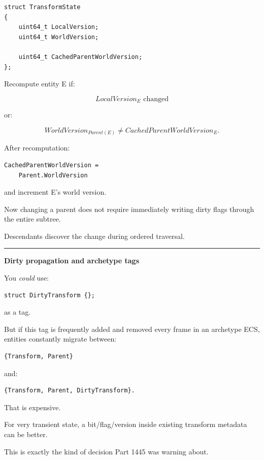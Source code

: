 \begin{verbatim}
struct TransformState
{
    uint64_t LocalVersion;
    uint64_t WorldVersion;

    uint64_t CachedParentWorldVersion;
};
\end{verbatim}

Recompute entity E if:

\[
LocalVersion_E
\text{ changed}
\]

or:

\[
WorldVersion_{Parent(E)}
\neq
CachedParentWorldVersion_E.
\]

After recomputation:

\begin{verbatim}
CachedParentWorldVersion =
    Parent.WorldVersion
\end{verbatim}

and increment E's world version.

Now changing a parent does not require immediately writing dirty flags through the entire subtree.

Descendants discover the change during ordered traversal.

\begin{center}\rule{0.5\linewidth}{0.5pt}\end{center}

\textbf{Dirty propagation and archetype tags}

You \emph{could} use:

\begin{verbatim}
struct DirtyTransform {};
\end{verbatim}

as a tag.

But if this tag is frequently added and removed every frame in an archetype ECS, entities constantly migrate between:

\begin{verbatim}
{Transform, Parent}
\end{verbatim}

and:

\begin{verbatim}
{Transform, Parent, DirtyTransform}.
\end{verbatim}

That is expensive.

For very transient state, a bit/flag/version inside existing transform metadata can be better.

This is exactly the kind of decision Part 1445 was warning about.

